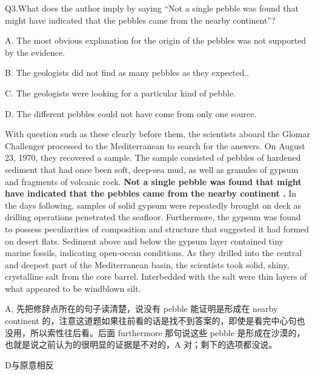 \begin{blk}
    \begin{qst}
        Q3.What does the author imply by saying “Not a single pebble was found that might have indicated that the pebbles came from the nearby continent”?
    \end{qst}

    \begin{chc}
        A. The most obvious explanation for the origin of the pebbles was not supported by the evidence.

        B. The geologists did not find as many pebbles as they expected..

        C. The geologists were looking for a particular kind of pebble.

        D. The different pebbles could not have come from only one source.
    \end{chc}

    \begin{psgq}
        With question such as these clearly before them, the scientists aboard the Glomar Challenger processed to the Mediterranean to search for the answers. On August 23, 1970, they recovered a sample. The sample consisted of pebbles of hardened sediment that had once been soft, deep-sea mud, as well as granules of gypsum and fragments of volcanic rock. \textbf{Not a single pebble was found that might have indicated that the pebbles came from the nearby continent .} In the days following, samples of solid gypsum were repeatedly brought on deck as drilling operations penetrated the seafloor. Furthermore, the gypsum was found to possess peculiarities of composition and structure that suggested it had formed on desert flats. Sediment above and below the gypsum layer contained tiny marine fossils, indicating open-ocean conditions. As they drilled into the central and deepest part of the Mediterranean basin, the scientists took solid, shiny, crystalline salt from the core barrel. Interbedded with the salt were thin layers of what appeared to be windblown silt.
    \end{psgq}

    \begin{nlz}
        A, 先把修辞点所在的句子读清楚，说没有 pebble 能证明是形成在 nearby continent 的，注意这道题如果往前看的话是找不到答案的，即使是看完中心句也没用，所以索性往后看。后面 furthermore 那句说这些 pebble 是形成在沙漠的，也就是说之前认为的很明显的证据是不对的，A 对；剩下的选项都没说。

        D与原意相反
    \end{nlz}
\end{blk}

